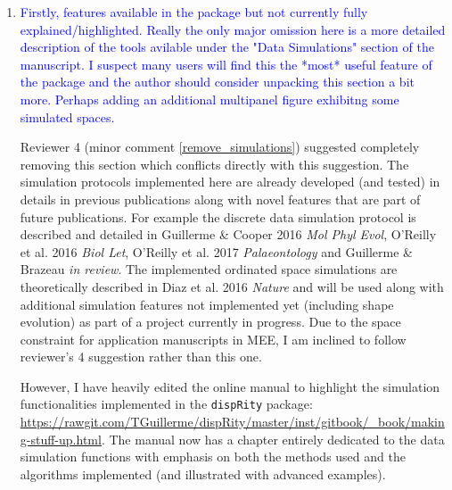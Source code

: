 \documentclass[12pt,letterpaper]{article}
\begin{document}
\begin{enumerate}
\item{\textcolor{blue}{Firstly, features available in the package but not currently fully explained/highlighted.
Really the only major omission here is a more detailed description of the tools avilable under the "Data Simulations" section of the manuscript.
I suspect many users will find this the *most* useful feature of the package and the author should consider unpacking this section a bit more.
Perhaps adding an additional multipanel figure exhibitng some simulated spaces.}}
\label{simulations}

Reviewer 4 (minor comment \ref{remove_simulations}) suggested completely removing this section which conflicts directly with this suggestion.
The simulation protocols implemented here are already developed (and tested) in details in previous publications along with novel features that are part of future publications.
For example the discrete data simulation protocol is described and detailed in Guillerme \& Cooper 2016 \textit{Mol Phyl Evol}, O’Reilly et al. 2016 \textit{Biol Let}, O'Reilly et al. 2017 \textit{Palaeontology} and Guillerme \& Brazeau \textit{in review}.
The implemented ordinated space simulations are theoretically described in Diaz et al. 2016 \textit{Nature} and will be used along with additional simulation features not implemented yet (including shape evolution) as part of a project currently in progress.
Due to the space constraint for application manuscripts in MEE, I am inclined to follow reviewer's 4 suggestion rather than this one.

However, I have heavily edited the online manual to highlight the simulation functionalities implemented in the \texttt{dispRity} package: \url{https://rawgit.com/TGuillerme/dispRity/master/inst/gitbook/_book/making-stuff-up.html}.
The manual now has a chapter entirely dedicated to the data simulation functions with emphasis on both the methods used and the algorithms implemented (and illustrated with advanced examples).


\end{enumerate}
\end{document}
